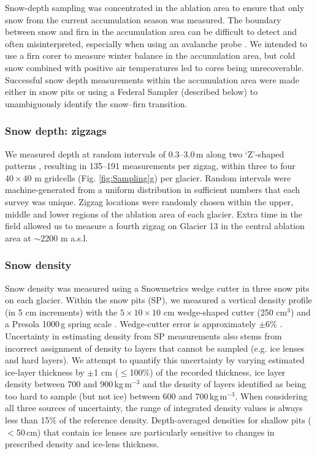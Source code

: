 \documentclass[twocolumn, letterpaper]{igs}
\begin{document}
Snow-depth sampling was concentrated in the ablation area to ensure that only snow from the current accumulation season was measured. The boundary between snow and firn in the accumulation area can be difficult to detect and often misinterpreted, especially when using an avalanche probe \citep{Grunewald2010,Sold2013}. We intended to use a firn corer to measure winter balance in the accumulation area, but cold snow combined with positive air temperatures led to cores being unrecoverable. Successful snow depth measurements within the accumulation area were made either in snow pits or using a Federal Sampler (described below) to unambiguously identify the snow--firn transition. 

\subsubsection{Snow depth: zigzags}

We measured depth at random intervals of 0.3--3.0\,m along two `Z'-shaped patterns \citep{Shea2010}, resulting in 135--191 measurements per zigzag, within three to four $40\times40$ m gridcells (Fig. \ref{fig:Sampling}g) per glacier. Random intervals were machine-generated from a uniform distribution in sufficient numbers that each survey was unique. Zigzag locations were randomly chosen within the upper, middle and lower regions of the ablation area of each glacier. Extra time in the field allowed us to measure a fourth zigzag on Glacier 13 in the central ablation area at $\sim$2200 m a.s.l. 

\subsubsection{Snow density}

Snow density was measured using a Snowmetrics wedge cutter in three snow pits on each glacier. Within the snow pits (SP), we measured a vertical density profile (in 5 cm increments) with the $5\times10\times 10$ cm wedge-shaped cutter (250 cm$^3$) and a Presola 1000\,g spring scale \citep[e.g.][]{Gray1981,Fierz2009}. Wedge-cutter error is approximately $\pm$6\% \citep[e.g.][]{Proksch2016,Carroll1977}. Uncertainty in estimating density from SP measurements also stems from incorrect assignment of density to layers that cannot be sampled (e.g. ice lenses and hard layers). We attempt to quantify this uncertainty by varying estimated ice-layer thickness by $\pm$1 cm ($\leq$100\%) of the recorded thickness, ice layer density between 700 and 900\,kg\,m$^{-3}$ and the density of layers identified as being too hard to sample (but not ice) between 600 and 700\,kg\,m$^{-3}$. When considering all three sources of uncertainty, the range of integrated density values is always less than 15\% of the reference density. Depth-averaged densities for shallow pits ($<$50\,cm) that contain ice lenses are particularly sensitive to changes in prescribed density and ice-lens thickness. 
\end{document}
